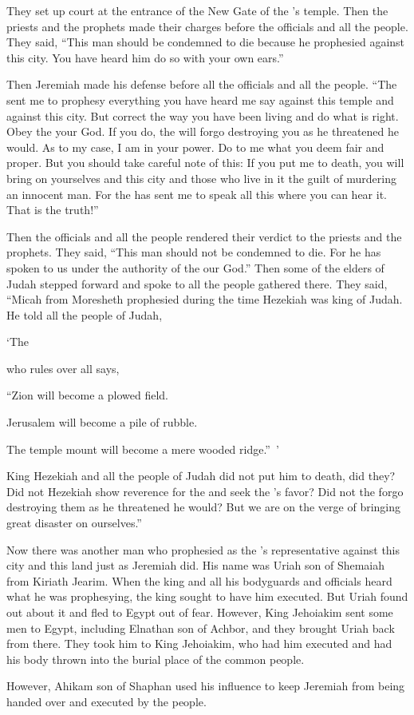 {They set up court
at the entrance
of the New
Gate
of the
{}’s temple.
Then the priests
and the prophets
made their charges before
the officials
and all
the people.
They said, “This
man
should be condemned
to die
because
he prophesied
against this
city.
You have
heard
him do so with your own ears.”
\par }{\PP {}Then Jeremiah
made his defense before
all
the officials
and all
the people. “The
{}
sent
me to prophesy
everything
you have
heard
me say
against this
temple
and against this
city.
But
correct
the way
you have been living
and do what is right. Obey
the {}
your God.
If you do, the
{}
will forgo
destroying
you as
he threatened he would.
As
to my case, I
am
in your power.
Do
to me what
you deem
fair
and proper.
But
you
should take careful
note
of this: If
you
put me to death,
you
will bring on
yourselves
and this city
and those who live
in it the guilt
of murdering
an innocent
man. For
the {}
has sent
me to speak
all
this
where you can hear it. That
is the truth!”
\par }{\PP {}Then the officials
and all
the people
rendered
their verdict to
the priests
and the prophets.
They said, “This
man
should not
be condemned
to die.
For
he has spoken
to
us under the authority
of the
{}
our God.”
Then
some
of the elders
of Judah stepped forward and spoke
to
all
the people
gathered
there. They said,
“Micah
from Moresheth
prophesied
during
the time
Hezekiah
was king
of Judah.
He told
all
the people
of Judah,
\par }{\Q ‘The

{}
who rules over all
says,
\par }{\Q “Zion
will become a plowed
field.
\par }{\Q Jerusalem
will become a pile of rubble.
\par }{\Q The temple
mount
will become
a mere wooded
ridge.” ’
\par }{\PP {}King
Hezekiah
and all
the people of Judah
did not put
him to death,
did they? Did not
Hezekiah show reverence
for the
{}
and seek
the
{}’s
favor? Did not the
{}
forgo
destroying
them as
he threatened
he would? But we
are on
the verge of bringing
great
disaster
on
ourselves.”
\par }{\PP {}Now
there was
another
man
who prophesied
as the
{}’s
representative
against
this city
and this land
just
as Jeremiah
did. His name
was Uriah
son
of Shemaiah
from Kiriath Jearim.
When the king
and all
his bodyguards
and officials
heard
what
he was prophesying, the king
sought
to have him executed.
But Uriah
found out about
it and fled
to Egypt
out of fear.
However, King
Jehoiakim
sent
some men
to Egypt,
including Elnathan
son
of Achbor,
and they brought
Uriah
back
from there.
They took
him to
King
Jehoiakim,
who had him executed
and had his body
thrown
into
the burial place
of the common people.
\par }{\PP {}However,
Ahikam
son
of Shaphan
used his influence
to keep Jeremiah
from being
handed
over and executed
by the people.


}
